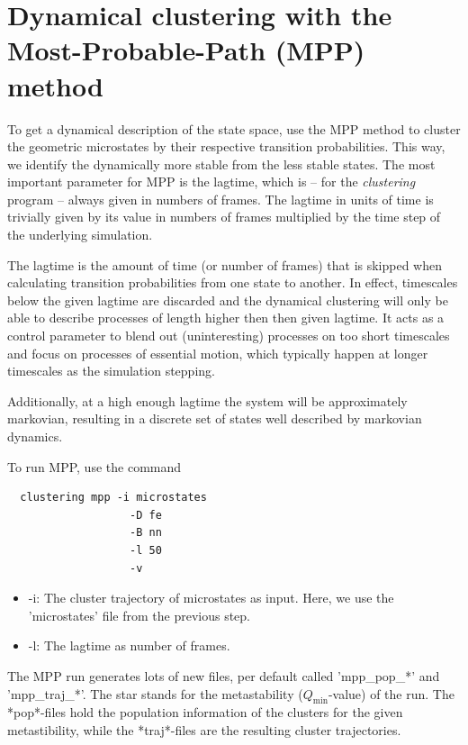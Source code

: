 \documentclass[12pt,a4paper,twoside,english,fleqn]{article}
\begin{document}
\section{Dynamical clustering with the Most-Probable-Path (MPP) method}
To get a dynamical description of the state space, use the MPP method to
cluster the geometric microstates by their respective transition probabilities.
This way, we identify the dynamically more stable from the less stable states.
The most important parameter for MPP is the lagtime, which is -- for the
\emph{clustering} program -- always given in numbers of frames.
The lagtime in units of time is trivially given by its value in numbers of
frames multiplied by the time step of the underlying simulation.

The lagtime is the amount of time (or number of frames) that is skipped when
calculating transition probabilities from one state to another.
In effect, timescales below the given lagtime are discarded and the dynamical
clustering will only be able to describe processes of length higher then then
given lagtime. It acts as a control parameter to blend out (uninteresting)
processes on too short timescales and focus on processes of essential motion,
which typically happen at longer timescales as the simulation stepping.

Additionally, at a high enough lagtime the system will be approximately
markovian, resulting in a discrete set of states well described by markovian
dynamics.

To run MPP, use the command
\begin{lstlisting}
  clustering mpp -i microstates
                   -D fe
                   -B nn
                   -l 50
                   -v
\end{lstlisting}

\begin{itemize}
  \item -i: The cluster trajectory of microstates as input. Here, we use the
            'microstates' file from the previous step.
  \item -l: The lagtime as number of frames.
\end{itemize}

The MPP run generates lots of new files, per default called 'mpp\_pop\_*' and
'mpp\_traj\_*'. The star stands for the metastability ($Q_\text{min}$-value)
of the run. The *pop*-files hold the population information of the clusters
for the given metastibility, while the *traj*-files are the resulting cluster
trajectories.
\end{document}
